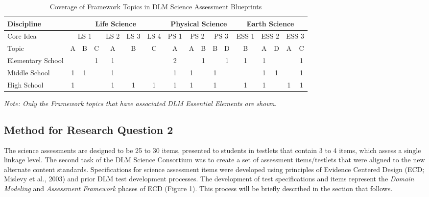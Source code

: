 \documentclass[11.5pt]{sig-alternate} %
\begin{document}
\begin{large}
\begin{table}[th]
\caption{Coverage of Framework Topics in DLM Science Assessment Blueprints}
\begin{tabular}{|l|c|c|c|c|c|c|c|c|c|c|c|c|c|c|c|c|}
\hline
Discipline & \multicolumn{6}{|c|}{Life Science} & \multicolumn{5}{|c|}{Physical Science} & \multicolumn{5}{|c|}{Earth Science} \\ \hline
Core Idea & \multicolumn{3}{|c|}{LS 1} & LS 2 & LS 3 & LS 4 & PS 1 & \multicolumn{2}{|c|}{PS 2} & \multicolumn{2}{|c|}{PS 3} & ESS 1 & \multicolumn{2}{|c|}{ESS 2} & \multicolumn{2}{|c|}{ESS 3} \\ \hline
Topic & A & B & C & A & B & C & A & A & B & B & D & B & A & D & A & C \\ \hline
Elementary School & & & 1 & 1 & & & 2 & & 1 & & 1 & 1 & 1 & & & 1 \\ \hline
Middle School & 1 & 1 & & 1 & & & 1 & 1 & & 1 & & & 1 & 1 & & 1 \\ \hline
High School & 1 & & & 1 & 1 & 1 & 1 & 1 & & 1 & & 1 & 1 & & 1 & 1 \\ \hline
\end{tabular}
\textit{Note: Only the Framework topics that have associated DLM Essential Elements are shown.}
\end{table}

\subsection*{Method for Research Question 2}

The science assessments are designed to be 25 to 30 items, presented to students in testlets that contain 3 to 4 items, which assess a single linkage level. The second task of the DLM Science Consortium was to create a set of assessment items/testlets that were aligned to the new alternate content standards. Specifications for science assessment items were developed using principles of Evidence Centered Design (ECD; Mislevy et al., 2003) and prior DLM test development processes. The development of test specifications and items represent the \textit{Domain Modeling} and \textit{Assessment Framework} phases of ECD (Figure 1). This process will be briefly described in the section that follows. 


\end{large}
\end{document}
